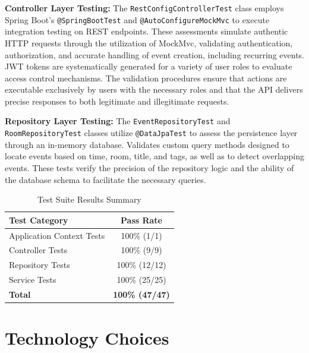 \textbf{Controller Layer Testing:} The \texttt{RestConfigControllerTest} class employs Spring Boot's \texttt{@SpringBootTest} and \texttt{@AutoConfigureMockMvc} to execute integration testing on REST endpoints.
These assessments simulate authentic HTTP requests through the utilization of MockMvc, validating authentication, authorization, and accurate handling of event creation, including recurring events.
JWT tokens are systematically generated for a variety of user roles to evaluate access control mechanisms.
The validation procedures ensure that actions are executable exclusively by users with the necessary roles and that the API delivers precise responses to both legitimate and illegitimate requests.

\textbf{Repository Layer Testing:} The \texttt{EventRepositoryTest} and \texttt{RoomRepositoryTest} classes utilize \texttt{@DataJpaTest} to assess the persistence layer through an in-memory database.
Validates custom query methods designed to locate events based on time, room, title, and tags, as well as to detect overlapping events.
These tests verify the precision of the repository logic and the ability of the database schema to facilitate the necessary queries.

\begin{table}[htbp]
    \centering
    \caption{Test Suite Results Summary}
    \begin{tabular}{|p{}|c|}
        \hline
        \textbf{Test Category}    & \textbf{Pass Rate}     \\
        \hline
        Application Context Tests & 100\% (1/1)            \\
        \hline
        Controller Tests          & 100\% (9/9)            \\
        \hline
        Repository Tests          & 100\% (12/12)          \\
        \hline
        Service Tests             & 100\% (25/25)          \\
        \hline
        \textbf{Total}            & \textbf{100\% (47/47)} \\
        \hline
    \end{tabular}
    \label{tab:test-results}
\end{table}


\section{Technology Choices}\label{sec:technology-choices}

